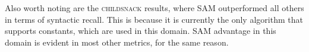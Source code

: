 \documentclass[letterpaper]{article} %
\newcommand{\sam}{\ac{SAM}\xspace}
\newcommand{\nolam}{NOLAM\xspace}
\newcommand{\offlam}{OffLAM\xspace}
\newcommand{\samshort}{SAM\xspace}
\newif\ifaddcomments
\newcommand{\roni}[1]{\ifaddcomments{\textcolor{red}{[Roni: #1]}}\fi}
\newcommand{\argaman}[1]{\ifaddcomments{\textcolor{blue}{[Argaman: #1]}}\fi}
\begin{document}
%
Also worth noting are the \textsc{childsnack} results, where \samshort outperformed all others in terms of syntactic recall. This is because it is currently the only algorithm that supports constants, which are used in this domain. \samshort advantage in this domain is evident in most other metrics, for the same reason. 
\end{document}
